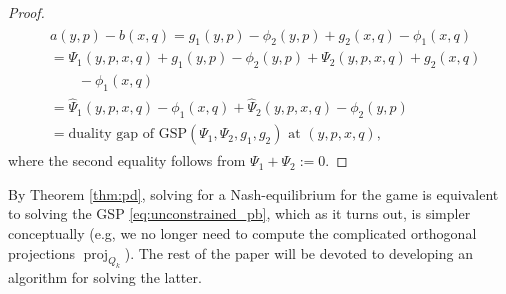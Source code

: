 \documentclass{article}
\DeclareMathOperator{\proj}{proj}
\begin{document}
\begin{proof}
\begin{eqnarray*}
  \begin{split}
    &a(y, p) - b(x, q) = g_1(y, p) - \phi_2(y, p) + g_2(x, q) - \phi_1(x,
  q) \\
  &= \Psi_1(y, p, x, q) +  g_1(y, p) - \phi_2(y, p) + \Psi_2(y, p, x,
  q) + g_2(x, q) \\
  &\hspace{2em}- \phi_1(x, q)\\
  &= \hat{\Psi}_1(y, p, x, q) - \phi_1(x,
  q) + \hat{\Psi}_2(y, p, x, q) - \phi_2(y, p)\\
  &= \text{duality gap of GSP}(\Psi_1, \Psi_2,
  g_1, g_2) \text{ at }(y, p, x, q),
  \end{split}
\end{eqnarray*}
where the second equality follows from %
$\Psi_1 + \Psi_2 := 0$.
\end{proof}


By Theorem \ref{thm:pd}, solving for a Nash-equilibrium for
the game is equivalent to solving the GSP
\eqref{eq:unconstrained_pb}, which as it turns out, is simpler
conceptually (e.g, we no longer need to compute the
complicated orthogonal projections $\proj_{Q_k}$). The rest of the
paper will be devoted to developing an algorithm for solving the latter.


\end{document}
